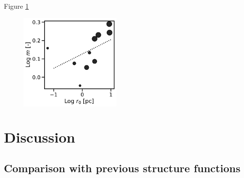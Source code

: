 \documentclass[fleqn,usenatbib, useAMS, a4paper]{mnras}
\newcommand\halpha{H${\alpha}$}
\begin{document}
Figure \ref{fig:mr0}

\begin{figure}
 \centering 
 \includegraphics[width=2in]{Figures/mr0.pdf}
 \caption{ }
 \label{fig:mr0}
\end{figure}



\section{Discussion}\label{sec:discussion}

\subsection{Comparison with previous structure functions}


\end{document}
